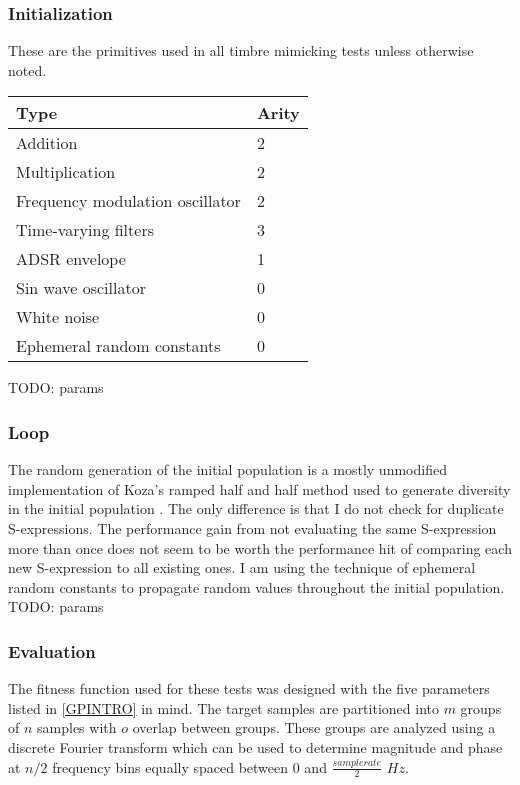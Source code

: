 \documentclass[12pt]{article}
\begin{document}
\subsubsection{Initialization}\label{TMINIT}
These are the primitives used in all timbre mimicking tests unless otherwise noted.
\begin{center}
\begin{tabular}{ | l | l | } \hline
Type & Arity \\ \hline
Addition & 2 \\ \hline
Multiplication & 2 \\ \hline
Frequency modulation oscillator & 2 \\ \hline
Time-varying filters & 3 \\ \hline
ADSR envelope & 1 \\ \hline
Sin wave oscillator & 0 \\ \hline
White noise & 0 \\ \hline
Ephemeral random constants & 0 \\ \hline
\end{tabular}
\end{center}
TODO: params
\subsubsection{Loop}

The random generation of the initial population is a mostly unmodified implementation of Koza's ramped half and half method used to generate diversity in the initial population \citep{koza1992genetic}. The only difference is that I do not check for duplicate S-expressions. The performance gain from not evaluating the same S-expression more than once does not seem to be worth the performance hit of comparing each new S-expression to all existing ones. I am using the technique of ephemeral random constants to propagate random values throughout the initial population.
TODO: params

\subsubsection{Evaluation}\label{TMEVAL}
The fitness function used for these tests was designed with the five parameters listed in \ref{GPINTRO} in mind. The target samples are partitioned into $m$ groups of $n$ samples with $o$ overlap between groups. These groups are analyzed using a discrete Fourier transform which can be used to determine magnitude and phase at $n/2$ frequency bins equally spaced between $0$ and $\frac{sample rate}{2}$ $Hz$.
\end{document}
